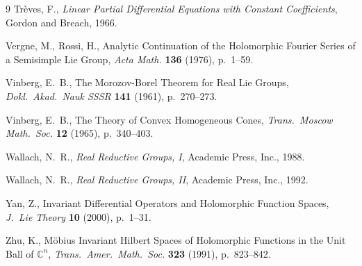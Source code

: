 \documentclass[10.5pt,reqno]{amsart}
\newcommand{\C}{\mathds{C}}
\begin{document}
\begin{thebibliography}{9}
	Trèves, F., \emph{Linear Partial Differential Equations with Constant Coefficients}, Gordon and Breach, 1966.
	


	
	Vergne, M.,  Rossi, H., Analytic Continuation of the Holomorphic Fourier Series of a Semisimple Lie Group, \emph{Acta Math.} \textbf{136} (1976), p.~1--59.
	
	Vinberg, E.\ B., The Morozov-Borel Theorem for Real Lie Groups, \emph{Dokl.\ Akad.\ Nauk SSSR} \textbf{141} (1961), p.~270--273.
	
	Vinberg, E.\ B., The Theory of Convex Homogeneous Cones, \emph{Trans.\ Moscow Math.\ Soc.} \textbf{12}	(1965), p.~340--403.
	

	Wallach, N.\ R., \emph{Real Reductive Groups, I},  Academic Press, Inc., 1988.
	
	Wallach, N.\ R., \emph{Real Reductive Groups, II},  Academic Press, Inc., 1992.

	
	Yan, Z., Invariant Differential Operators and Holomorphic Function Spaces, \emph{J.\ Lie Theory} \textbf{10} (2000), p.~1--31.
	
	Zhu, K., M\"obius Invariant Hilbert Spaces of Holomorphic Functions in the Unit Ball of $\C^n$, \emph{Trans.\ Amer.\ Math.\ Soc.} \textbf{323} (1991), p.~823--842.
	
\end{thebibliography}
\end{document}
